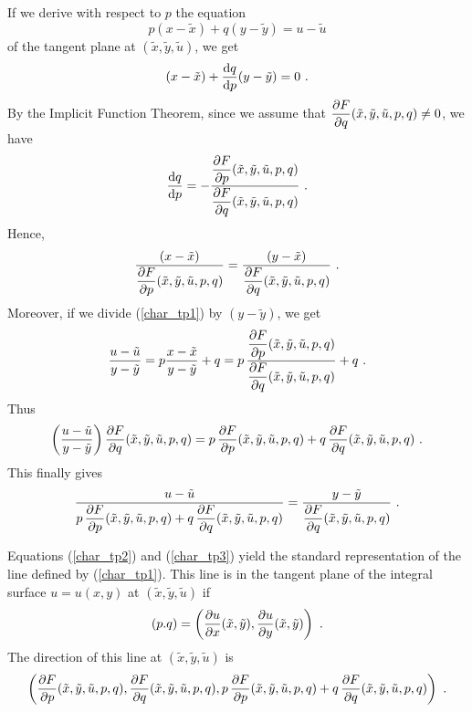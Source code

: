 If we derive with respect to $p$ the equation
\begin{equation} \label{char_tp1}
p(x-\tilde{x}) + q(y-\tilde{y}) = u-\tilde{u}
\end{equation}
of the tangent plane at $(\tilde{x},\tilde{y},\tilde{u})$, we get
\[
(x-\tilde{x}) + \frac{\mathrm{d}q}{\mathrm{d}{p}}(y-\tilde{y}) = 0 \ .
\]
By the Implicit Function Theorem, since we assume that
$\displaystyle \frac{\partial{F}}{\partial q}(\tilde{x},\tilde{y},\tilde{u},p,q) \neq 0$,
we have 
\[
\dydx{q}{p} =
- \frac{\displaystyle \pdydx{F}{p}(\tilde{x},\tilde{y},\tilde{u},p,q)}
{\displaystyle \pdydx{F}{q}(\tilde{x},\tilde{y},\tilde{u},p,q)} \ .
\]
Hence,
\begin{equation} \label{char_tp2}
\frac{(x-\tilde{x})}{\displaystyle \frac{\partial{F}}{\partial p}
(\tilde{x},\tilde{y},\tilde{u},p,q)} = 
\frac{(y-\tilde{x})}{\displaystyle \frac{\partial{F}}{\partial q}
(\tilde{x},\tilde{y},\tilde{u},p,q)} \ .
\end{equation}
Moreover, if we divide (\ref{char_tp1}) by $(y-\tilde{y})$, we get
\[
\frac{u-\tilde{u}}{y-\tilde{y}} = p\frac{x-\tilde{x}}{y-\tilde{y}} + q = 
p\, \frac{\displaystyle \pdydx{F}{p}(\tilde{x},\tilde{y},\tilde{u},p,q)}
{\displaystyle \pdydx{F}{q}(\tilde{x},\tilde{y},\tilde{u},p,q)} + q \ .
\]
Thus
\[
\left(\frac{u-\tilde{u}}{y-\tilde{y}}\right)
\frac{\partial{F}}{\partial q}(\tilde{x},\tilde{y},\tilde{u},p,q) = 
p\, \frac{\partial{F}}{\partial p}(\tilde{x},\tilde{y},\tilde{u},p,q)
+ q\, \frac{\partial{F}}{\partial q}(\tilde{x},\tilde{y},\tilde{u},p,q) \ .
\]
This finally gives
\begin{equation} \label{char_tp3}
\frac{u-\tilde{u}}{\displaystyle p\,
\pdydx{F}{p}(\tilde{x},\tilde{y},\tilde{u},p,q) +
q\, \pdydx{F}{q}(\tilde{x},\tilde{y},\tilde{u},p,q)}
= \frac{y-\tilde{y}}
{\displaystyle \pdydx{F}{q}(\tilde{x},\tilde{y},\tilde{u},p,q)} \ .
\end{equation}

Equations (\ref{char_tp2}) and (\ref{char_tp3}) yield the
standard representation of the line defined by (\ref{char_tp1}).  This
line is in the tangent plane of the integral surface
$u=u(x,y)$ at $(\tilde{x},\tilde{y},\tilde{u})$ if
\[
(p.q) = \left( \frac{\partial{u}}{\partial x}(\tilde{x},\tilde{y}) ,
\frac{\partial{u}}{\partial y}(\tilde{x},\tilde{y}) \right) \ .
\]
The direction of this line at $(\tilde{x},\tilde{y},\tilde{u})$ is
\[
\left( \pdydx{F}{p}(\tilde{x},\tilde{y},\tilde{u},p,q),
\pdydx{F}{q}(\tilde{x},\tilde{y},\tilde{u},p,q) ,
p\, \pdydx{F}{p}(\tilde{x},\tilde{y},\tilde{u},p,q)
+ q\, \pdydx{F}{q}(\tilde{x},\tilde{y},\tilde{u},p,q) \right) \ .
\]

